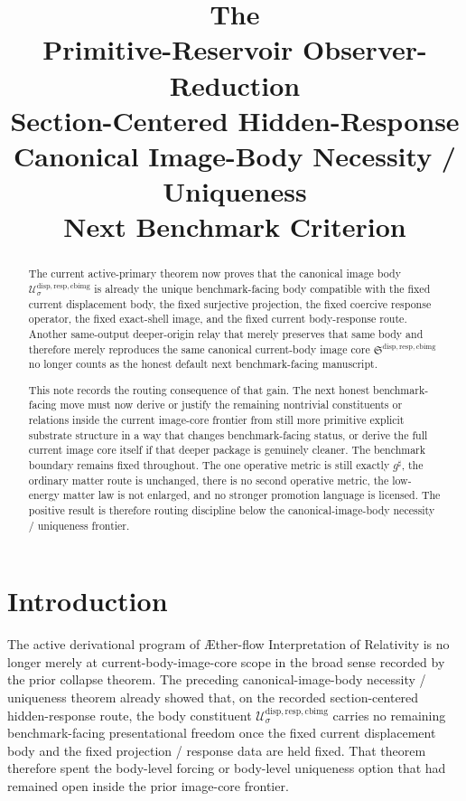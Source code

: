 \documentclass[11pt]{article}
\title{\textbf{The \TheoryName{}}\\[0.4em]
\large Primitive-Reservoir Observer-Reduction\\
\large Section-Centered Hidden-Response\\
\large Canonical Image-Body Necessity / Uniqueness\\
\large Next Benchmark Criterion}
\author{}
\date{}
\newcommand{\Aflow}{\AE{}ther-flow}
\newcommand{\TheoryName}{\Aflow{} Interpretation of Relativity}
\newcommand{\CompletedMetric}{g^{\sharp}}
\newcommand{\CurrentBodyImageCore}{\mathfrak S^{\mathrm{disp,resp,cbimg}}}
\newcommand{\CanonicalImageBody}[1]{\mathcal U_{#1}^{\mathrm{disp,resp,cbimg}}}
\begin{document}
\maketitle

\begin{abstract}
The current active-primary theorem now proves that the canonical image body \(\CanonicalImageBody{\sigma}\) is already the unique benchmark-facing body compatible with the fixed current displacement body, the fixed surjective projection, the fixed coercive response operator, the fixed exact-shell image, and the fixed current body-response route. Another same-output deeper-origin relay that merely preserves that same body and therefore merely reproduces the same canonical current-body image core \(\CurrentBodyImageCore\) no longer counts as the honest default next benchmark-facing manuscript.

This note records the routing consequence of that gain. The next honest benchmark-facing move must now derive or justify the remaining nontrivial constituents or relations inside the current image-core frontier from still more primitive explicit substrate structure in a way that changes benchmark-facing status, or derive the full current image core itself if that deeper package is genuinely cleaner. The benchmark boundary remains fixed throughout. The one operative metric is still exactly \(\CompletedMetric\), the ordinary matter route is unchanged, there is no second operative metric, the low-energy matter law is not enlarged, and no stronger promotion language is licensed. The positive result is therefore routing discipline below the canonical-image-body necessity / uniqueness frontier.
\end{abstract}

\section{Introduction}

The active derivational program of \TheoryName{} is no longer merely at current-body-image-core scope in the broad sense recorded by the prior collapse theorem. The preceding canonical-image-body necessity / uniqueness theorem already showed that, on the recorded section-centered hidden-response route, the body constituent \(\CanonicalImageBody{\sigma}\) carries no remaining benchmark-facing presentational freedom once the fixed current displacement body and the fixed projection / response data are held fixed. That theorem therefore spent the body-level forcing or body-level uniqueness option that had remained open inside the prior image-core frontier.
\end{document}
